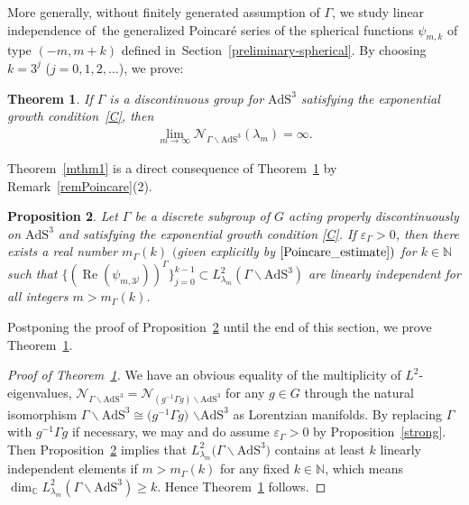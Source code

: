 \documentclass[10pt,a4paper]{amsart}
\numberwithin{equation}{section}
\newtheorem{Theorem}{Theorem}[section]
\newtheorem{Proposition}[Theorem]{Proposition}
\begin{document}
More generally, without finitely generated assumption of $\Gamma$,
we study linear independence of~the generalized Poincar\'e series
of the spherical functions $\psi_{m,k}$ of type $(-m,m+k)$
defined in~Section~\ref{preliminary-spherical}.
By choosing $k=3^{j}$ ($j=0,1,2,\ldots$),
we prove:
\begin{Theorem}
\label{unbound}
If $\Gamma$ is a discontinuous group for $\mathrm{AdS}^{3}$ satisfying
the exponential growth condition~\eqref{C}, then
\begin{gather*}
\lim_{m\to\infty}\mathcal{N}_{\Gamma\backslash\mathrm{AdS}^{3}}(\lambda_{m})=\infty.
\end{gather*}
\end{Theorem}
Theorem~\ref{mthm1} is a direct consequence of
Theorem~\ref{unbound} by Remark~\ref{remPoincare}(2).

\begin{Proposition}
\label{mainthm}
Let $\Gamma$ be a discrete subgroup of $G$ acting properly discontinuously
on $\mathrm{AdS}^{3}$
and satisfying the exponential growth condition \eqref{C}.
If $\varepsilon_{\Gamma}>0$,
then there exists a real number $m_{\Gamma}(k)$
$($given explicitly by $\eqref{Poincare_estimate})$
for $k\in \mathbb{N}$
such that
$\{(\operatorname{Re}(\psi_{m,3^{j}}))^{\Gamma}\}_{j=0}^{k-1}
\subset L^2_{\lambda_{m}}(\Gamma\backslash\mathrm{AdS}^{3})$
are linearly independent
for all integers $m > m_{\Gamma}(k)$.
\end{Proposition}

Postponing the proof of Proposition~\ref{mainthm} until the end of this section,
we prove Theorem~\ref{unbound}.

\begin{proof}[Proof of Theorem~\ref{unbound}]
We have an obvious equality of the multiplicity of $L^2$-eigenvalues,
$\mathcal{N}_{\Gamma\backslash\mathrm{AdS}^{3}} =
\mathcal{N}_{(g^{-1}\Gamma g)\backslash\mathrm{AdS}^{3}}$
for any $g\in G$
through the natural isomorphism
$\Gamma\backslash\mathrm{AdS}^{3} \cong
\big(g^{-1}\Gamma g\big)$ $\backslash\mathrm{AdS}^{3}$ as Lorentzian manifolds.
By replacing $\Gamma$ with $g^{-1}\Gamma g$ if necessary,
we may and do assume $\varepsilon_{\Gamma}>0$ by Proposition~\ref{strong}.
Then Proposition~\ref{mainthm} implies that
$L^2_{\lambda_{m}}\big(\Gamma\backslash \mathrm{AdS}^{3}\big)$ contains at least
$k$ linearly independent elements
if $m>m_{\Gamma}(k)$ for any fixed $k\in\mathbb{N}$,
which means
$\dim_{\mathbb{C}} L^2_{\lambda_{m}}(\Gamma\backslash\mathrm{AdS}^{3})
\geq k.$
Hence Theorem~\ref{unbound} follows.
\end{proof}
\end{document}
